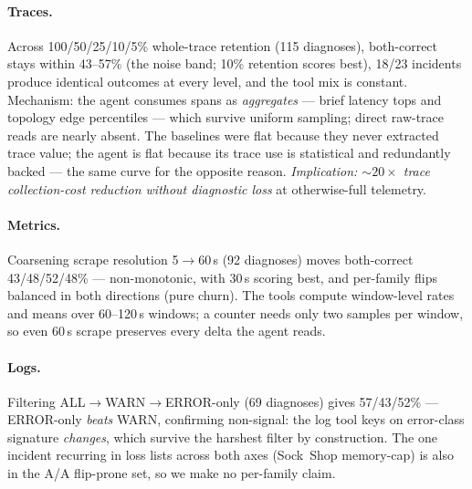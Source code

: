 \paragraph{Traces.} Across 100/50/25/10/5\% whole-trace retention (115 diagnoses),
both-correct stays within 43--57\% (the noise band; 10\% retention scores best), 18/23
incidents produce identical outcomes at every level, and the tool mix is constant.
Mechanism: the agent consumes spans as \emph{aggregates} --- brief latency tops and
topology edge percentiles --- which survive uniform sampling; direct raw-trace reads
are nearly absent. The baselines were flat because they never extracted trace value;
the agent is flat because its trace use is statistical and redundantly backed --- the
same curve for the opposite reason. \emph{Implication: ${\sim}20\times$ trace
collection-cost reduction without diagnostic loss} at otherwise-full telemetry.

\paragraph{Metrics.} Coarsening scrape resolution 5$\to$60\,s (92 diagnoses) moves
both-correct 43/48/52/48\% --- non-monotonic, with 30\,s scoring best, and per-family
flips balanced in both directions (pure churn). The tools compute window-level rates
and means over 60--120\,s windows; a counter needs only two samples per window, so
even 60\,s scrape preserves every delta the agent reads.

\paragraph{Logs.} Filtering ALL$\to$WARN$\to$ERROR-only (69 diagnoses) gives
57/43/52\% --- ERROR-only \emph{beats} WARN, confirming non-signal: the log tool keys
on error-class signature \emph{changes}, which survive the harshest filter by
construction. The one incident recurring in loss lists across both axes (Sock~Shop
memory-cap) is also in the A/A flip-prone set, so we make no per-family claim.

